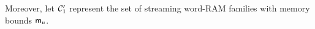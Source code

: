 Moreover, let $\mathcal{C}_1^{\prime}$ represent the set of streaming word-RAM families with memory bounds $\mathsf{m_u}$.
